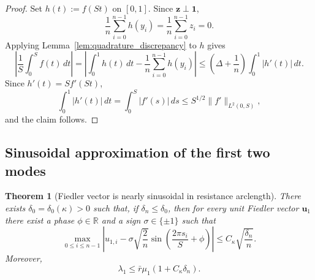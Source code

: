 \documentclass[11pt]{article}
\numberwithin{equation}{section}
\newtheorem{theorem}{Theorem}[section]
\theoremstyle{definition}
\theoremstyle{remark}
\begin{document}
\begin{proof}
	Set $h(t):=f(St)$ on $[0,1]$. Since
	$\boldsymbol{z}\perp\boldsymbol{1}$,
	\[
	\frac1n\sum_{i=0}^{n-1}h(y_i)=\frac1n\sum_{i=0}^{n-1}z_i=0.
	\]
	Applying Lemma~\ref{lem:quadrature_discrepancy} to $h$ gives
	\[
	\left|\frac1S\int_0^Sf(t)\,dt\right|
	=
	\left|\int_0^1h(t)\,dt-\frac1n\sum_{i=0}^{n-1}h(y_i)\right|
	\le
	\left(\Delta+\frac1n\right)\int_0^1|h'(t)|\,dt.
	\]
	Since $h'(t)=Sf'(St)$,
	\[
	\int_0^1|h'(t)|\,dt
	=
	\int_0^S|f'(s)|\,ds
	\le
	S^{1/2}\|f'\|_{L^2(0,S)},
	\]
	and the claim follows.
\end{proof}

\subsection{Sinusoidal approximation of the first two modes}

\begin{theorem}[Fiedler vector is nearly sinusoidal in resistance arclength]\label{thm:fiedler-sine}
	There exists $\delta_0=\delta_0(\kappa)>0$ such that, if
	$\delta_n\le \delta_0$, then for every unit Fiedler vector
	$\boldsymbol{u}_1$ there exist a phase $\phi\in\mathbb{R}$ and a sign
	$\sigma\in\{\pm 1\}$ such that
	\begin{equation}\label{eq:fiedler_sine_sup}
		\max_{0\le i\le n-1}
		\left|
		u_{1,i}-\sigma\sqrt{\frac2n}
		\sin\left(\frac{2\pi s_i}{S}+\phi\right)
		\right|
		\le
		C_\kappa\sqrt{\frac{\delta_n}{n}}.
	\end{equation}
	Moreover,
	\begin{equation}\label{eq:lambda1_upper_for_later}
		\lambda_1\le \bar r\mu_1(1+C_\kappa\delta_n).
	\end{equation}
\end{theorem}
\end{document}
